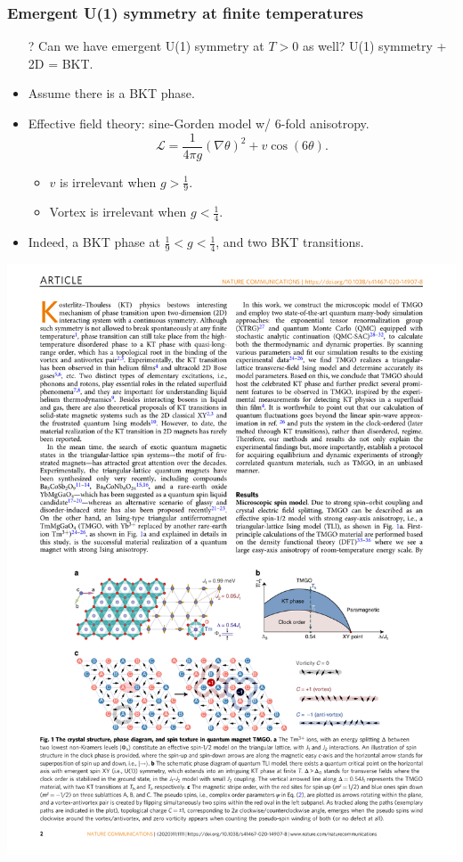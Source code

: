 \documentclass[xcolor=table, aspectratio=1610,ignorenonframetext]{beamer}
\begin{document}
\begin{frame}
  \frametitle{Emergent U(1) symmetry at finite temperatures}
  \begin{itemize}
    \item[?] Can we have emergent U(1) symmetry at $T>0$ as well? U(1) symmetry + 2D = BKT.
    \item \alert{Assume} there is a BKT phase.
    \item Effective field theory: sine-Gorden model w/ 6-fold anisotropy.
    \[\mathcal L = \frac1{4\pi g}(\nabla\theta)^2 + v\cos(6\theta).\]
    \begin{itemize}
      \item $v$ is irrelevant when $g>\frac19$.
      \item Vortex is irrelevant when $g < \frac14$.
    \end{itemize}
    \item Indeed, a BKT phase at $\frac19<g<\frac14$, and two BKT transitions.
  \end{itemize}
  \begin{center}
    \includegraphics{phase-diagram}
  \end{center}
\end{frame}
\end{document}
